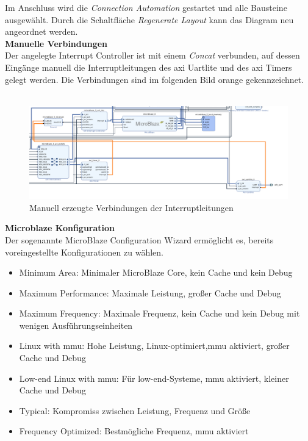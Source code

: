 Im Anschluss wird die \emph{Connection Automation} gestartet und alle Bausteine ausgewählt.
Durch die Schaltfläche \emph{Regenerate Layout} kann das Diagram neu angeordnet werden.\\

\textbf{Manuelle Verbindungen}\\

Der angelegte Interrupt Controller ist mit einem \emph{Concat} verbunden, auf dessen Eingänge manuell die Interruptleitungen des \ac{axi} Uartlite und des \ac{axi} Timers gelegt werden.
Die Verbindungen sind im folgenden Bild orange gekennzeichnet.\\\\

\begin{figure}[H]
\centering
\includegraphics[width=1\textwidth]{Hauptteil/Schritt8.png}
\caption{Manuell erzeugte Verbindungen der Interruptleitungen}\label{fig:mbschritt8}
\end{figure}

\newpage

\textbf{Microblaze Konfiguration}\\

Der sogenannte MicroBlaze Configuration Wizard ermöglicht es, bereits voreingestellte Konfigurationen zu wählen.

\begin{itemize}
  \item Minimum Area: Minimaler MicroBlaze Core, kein Cache und kein Debug
  \item Maximum Performance: Maximale Leistung, großer Cache und Debug
  \item Maximum Frequency: Maximale Frequenz, kein Cache und kein Debug mit wenigen Ausführungseinheiten
  \item Linux with \ac{mmu}: Hohe Leistung, Linux-optimiert,\ac{mmu} aktiviert, großer Cache und Debug
  \item Low-end Linux with \ac{mmu}: Für low-end-Systeme, \ac{mmu} aktiviert, kleiner Cache und Debug
  \item Typical: Kompromiss zwischen Leistung, Frequenz und Größe
  \item Frequency Optimized: Bestmögliche Frequenz, \ac{mmu} aktiviert
\end{itemize}

